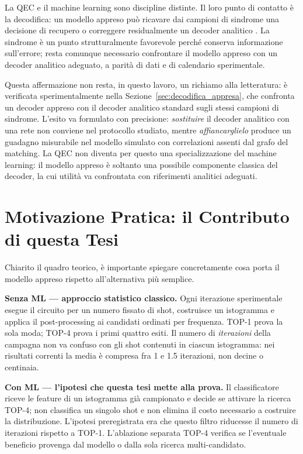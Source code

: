 \begin{onehalfspace}
La QEC e il machine learning sono discipline distinte. Il loro punto di contatto è la decodifica: un modello appreso può ricavare dai campioni di sindrome una decisione di recupero o correggere residualmente un decoder analitico \cite{torlaiMelko2017, alphaqubit2024}. La sindrome è un punto strutturalmente favorevole perché conserva informazione sull'errore; resta comunque necessario confrontare il modello appreso con un decoder analitico adeguato, a parità di dati e di calendario sperimentale.

Questa affermazione non resta, in questo lavoro, un richiamo alla letteratura: è verificata sperimentalmente nella Sezione~\ref{sec:decodifica_appresa}, che confronta un decoder appreso con il decoder analitico standard sugli stessi campioni di sindrome. L'esito va formulato con precisione: \emph{sostituire} il decoder analitico con una rete non conviene nel protocollo studiato, mentre \emph{affiancarglielo} produce un guadagno misurabile nel modello simulato con correlazioni assenti dal grafo del matching. La QEC non diventa per questo una specializzazione del machine learning: il modello appreso è soltanto una possibile componente classica del decoder, la cui utilità va confrontata con riferimenti analitici adeguati.

\section{Motivazione Pratica: il Contributo di questa Tesi}
\label{sec:motivazione_ml}

Chiarito il quadro teorico, è importante spiegare concretamente cosa porta il modello appreso rispetto all'alternativa più semplice.

\textbf{Senza ML --- approccio statistico classico.} Ogni iterazione sperimentale esegue il circuito per un numero fissato di shot, costruisce un istogramma e applica il post-processing ai candidati ordinati per frequenza. TOP-1 prova la sola moda; TOP-4 prova i primi quattro esiti. Il numero di \emph{iterazioni} della campagna non va confuso con gli shot contenuti in ciascun istogramma: nei risultati correnti la media è compresa fra 1 e 1.5 iterazioni, non decine o centinaia.

\textbf{Con ML --- l'ipotesi che questa tesi mette alla prova.} Il classificatore riceve le feature di un istogramma già campionato e decide se attivare la ricerca TOP-4; non classifica un singolo shot e non elimina il costo necessario a costruire la distribuzione. L'ipotesi preregistrata era che questo filtro riducesse il numero di iterazioni rispetto a TOP-1. L'ablazione separata TOP-4 verifica se l'eventuale beneficio provenga dal modello o dalla sola ricerca multi-candidato.


\end{onehalfspace}
